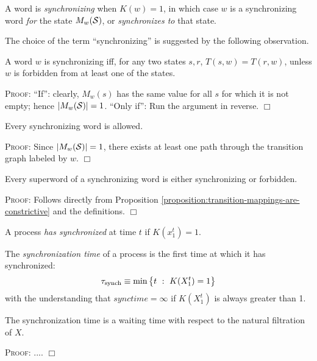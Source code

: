 \documentclass[../new-procedure.tex]{subfiles}
\begin{document}
\begin{definition}
  A word is {\em synchronizing} when $K(w) = 1$, in which case $w$ is a
  synchronizing word {\em for} the state $M_w(\mathcal{S})$, or {\em
    synchronizes to} that state.
\end{definition}

The choice of the term ``synchronizing'' is suggested by the following
observation.

\begin{proposition}
  A word $w$ is synchronizing iff, for any two states $s, r$, $T(s,w) =
  T(r,w)$, unless $w$ is forbidden from at least one of the states.
\end{proposition}

\textsc{Proof}: ``If'': clearly, $M_w(s)$ has the same value for all $s$ for
which it is not empty; hence $|M_w(\mathcal{S})| = 1$.  ``Only if'': Run the
argument in reverse. $\Box$

\begin{proposition}
Every synchronizing word is allowed.
\end{proposition}

\textsc{Proof}: Since $|M_w(\mathcal{S})| = 1$, there exists at least one path
through the transition graph labeled by $w$. $\Box$

\begin{proposition}
  Every superword of a synchronizing word is either synchronizing or forbidden.
\end{proposition}

\textsc{Proof}: Follows directly from Proposition
\ref{proposition:transition-mappings-are-constrictive} and the definitions.
$\Box$

\begin{definition}
  A process {\em has synchronized} at time $t$ if $K(x_1^t) = 1$.
\end{definition}

\begin{definition}
  The {\em synchronization time} of a process is the first time at which it has
  synchronized:
  \begin{equation}
    \tau_{\mathrm{synch}} \equiv \min{\left\{t ~ : ~ K(X_1^t) = 1 \right\}}
  \end{equation}
  with the understanding that $synctime = \infty$ if $K(X_1^t)$ is always
  greater than 1.
\end{definition}

\begin{proposition}
  The synchronization time is a waiting time with respect to the natural
  filtration of $X$.
\end{proposition}
\textsc{Proof}: .... $\Box$
\end{document}
